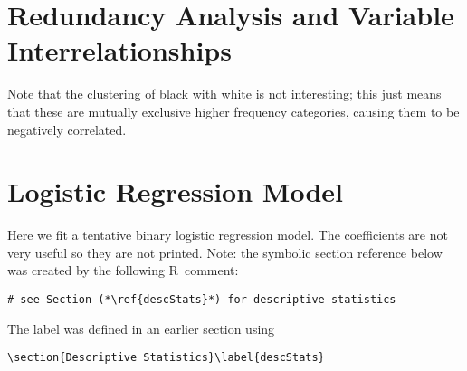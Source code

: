 \documentclass{article}
\newcommand{\bc}{\begin{center}}  %
\newcommand{\ec}{\end{center}}
\newcommand{\R}{{\normalfont\textsf{R}}{}}
\begin{document}
\section{Redundancy Analysis and Variable Interrelationships}
\bc

\begin{knitrout}
\color{fgcolor}\begin{kframe}
\begin{alltt}
 \hlkwb{<-} \hlstd{(}\hlopt{~} 
\end{alltt}


{\ttfamily\noindent\bfseries{}}\begin{alltt}
\end{alltt}


{\ttfamily\noindent\bfseries\color{errorcolor}{\#\# Error in plot(v): object 'v' not found}}\begin{alltt}
\hlstd{(}\hlopt{~}\hlopt{+}\hlopt{+}\hlopt{+}\hlopt{+}\hlopt{+}\hlopt{+}\hlopt{+} 
\end{alltt}


{\ttfamily\noindent\bfseries{}}\begin{alltt}
\end{alltt}
\end{kframe}
\end{knitrout}
\ec
Note that the clustering of black with white is not interesting; this just means that these are mutually exclusive higher frequency categories, causing them to be negatively correlated.
\section{Logistic Regression Model}
Here we fit a tentative binary logistic regression model.  The
coefficients are not very useful so they are not
printed.  Note: the symbolic section reference below was created by the
following \R\ comment:
\begin{verbatim}
# see Section (*\ref{descStats}*) for descriptive statistics
\end{verbatim}
The label was defined in an earlier section using
\begin{verbatim}
\section{Descriptive Statistics}\label{descStats}
\end{verbatim}
\end{document}
